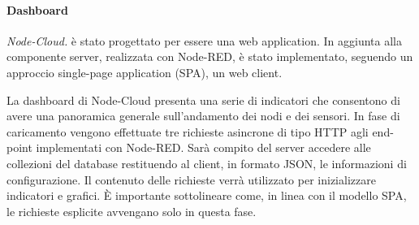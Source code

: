 \documentclass{article}
\begin{document}
\paragraph{Dashboard}
\emph{Node-Cloud.} è stato progettato per essere una web application. In aggiunta alla componente server, realizzata con Node-RED, è stato implementato, seguendo un approccio single-page application (SPA), un web client.

La dashboard di Node-Cloud presenta una serie di indicatori che consentono di avere una panoramica generale sull’andamento dei nodi e dei sensori. In fase di caricamento vengono effettuate tre richieste asincrone di tipo HTTP agli end-point implementati con Node-RED. Sarà compito del server accedere alle collezioni del database restituendo al client, in formato JSON, le informazioni di configurazione. Il contenuto delle richieste verrà utilizzato per inizializzare indicatori e grafici. È importante sottolineare come, in linea con il modello SPA, le richieste esplicite avvengano solo in questa fase.
\end{document}
